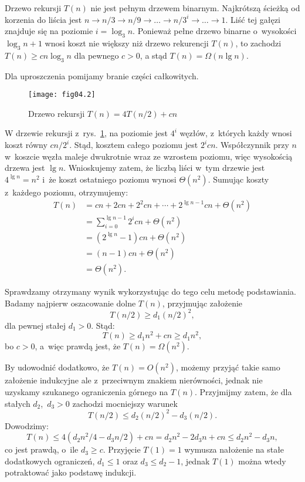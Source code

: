 \exercise %
Drzewo rekursji $T(n)$ nie jest pełnym drzewem binarnym. Najkrótszą ścieżką od korzenia do liścia jest $n\to n/3\to n/9\to\dots\to n/3^i\to\dots\to1$. Liść tej gałęzi znajduje się na poziomie $i=\log_3n$. Ponieważ pełne drzewo binarne o~wysokości $\log_3n+1$ wnosi koszt nie większy niż drzewo rekurencji $T(n)$, to zachodzi $T(n)\ge cn\log_3n$ dla pewnego $c>0$, a stąd $T(n)=\Omega(n\lg n)$.

\exercise %
Dla uproszczenia pomijamy branie części całkowitych.
\begin{figure}[ht]
	\begin{center}
		\texttt{[image: fig04.2]}
	\end{center}
	\caption{Drzewo rekursji $T(n)=4T(n/2)+cn$} \label{fig:4.2-3}
\end{figure}
W drzewie rekursji z~rys.~\ref{fig:4.2-3}, na  poziomie jest $4^i$ węzłów, z~których każdy wnosi koszt równy $cn/2^i$. Stąd, kosztem całego poziomu jest $2^icn$. Współczynnik przy $n$ w~koszcie węzła maleje dwukrotnie wraz ze wzrostem poziomu, więc wysokością drzewa jest $\lg n$. Wnioskujemy zatem, że liczbą liści w~tym drzewie jest $4^{\lg n}=n^2$ i~że koszt ostatniego poziomu wynosi $\Theta(n^2)$. Sumując koszty z~każdego poziomu, otrzymujemy:
\begin{align*}
	T(n) &= cn+2cn+2^2cn+\cdots+2^{\lg n-1}cn+\Theta(n^2) \\
	&= \sum_{i=0}^{\lg n-1}2^icn+\Theta(n^2) \\
	&= (2^{\lg n}-1)cn+\Theta(n^2) \\
	&= (n-1)cn+\Theta(n^2) \\
	&= \Theta(n^2).
\end{align*}

Sprawdzamy otrzymany wynik wykorzystując do tego celu metodę podstawiania. Badamy najpierw oszacowanie dolne $T(n)$, przyjmując założenie
\[
	T(n/2) \ge d_1(n/2)^2,
\]
dla pewnej stałej $d_1>0$. Stąd:
\[
	T(n) \ge d_1n^2+cn \ge d_1n^2, 
\]
bo $c>0$, a~więc prawdą jest, że $T(n)=\Omega(n^2)$.

By udowodnić dodatkowo, że $T(n)=O(n^2)$, możemy przyjąć takie samo założenie indukcyjne ale z~przeciwnym znakiem nierówności, jednak nie uzyskamy szukanego ograniczenia górnego na $T(n)$. Przyjmijmy zatem, że dla stałych $d_2$,~$d_3>0$ zachodzi mocniejszy warunek
\[
	T(n/2) \le d_2(n/2)^2-d_3(n/2).
\]
Dowodzimy:
\[
	T(n) \le 4(d_2n^2\!/4-d_3n/2)+cn = d_2n^2-2d_3n+cn \le d_2n^2-d_3n,
\]
co jest prawdą, o~ile $d_3\ge c$. Przyjęcie $T(1)=1$ wymusza nałożenie na stałe dodatkowych ograniczeń, $d_1\le1$ oraz $d_3\le d_2-1$, jednak $T(1)$ można wtedy potraktować jako podstawę indukcji.

